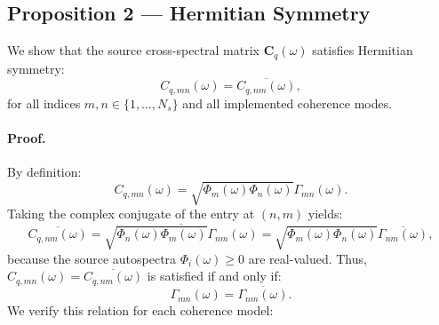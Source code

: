 \documentclass[11pt]{article}
\newcommand{\mat}[1]{\bm{#1}}
\begin{document}
\subsection{Proposition 2 --- Hermitian Symmetry}

We show that the source cross-spectral matrix $\mat{C}_q(\omega)$ satisfies Hermitian symmetry:
\begin{equation*}
    C_{q,mn}(\omega) = \overline{C_{q,nm}(\omega)},
\end{equation*}
for all indices $m, n \in \{1, \dots, N_s\}$ and all implemented coherence modes.

\paragraph{Proof.}
By definition:
\begin{equation*}
    C_{q,mn}(\omega) = \sqrt{\Phi_m(\omega)\Phi_n(\omega)} \Gamma_{mn}(\omega).
\end{equation*}
Taking the complex conjugate of the entry at $(n,m)$ yields:
\begin{equation*}
    \overline{C_{q,nm}(\omega)}
    =
    \overline{\sqrt{\Phi_n(\omega)\Phi_m(\omega)} \Gamma_{nm}(\omega)}
    =
    \sqrt{\Phi_m(\omega)\Phi_n(\omega)} \overline{\Gamma_{nm}(\omega)},
\end{equation*}
because the source autospectra $\Phi_i(\omega) \ge 0$ are real-valued. Thus, $C_{q,mn}(\omega) = \overline{C_{q,nm}(\omega)}$ is satisfied if and only if:
\begin{equation*}
    \Gamma_{mn}(\omega) = \overline{\Gamma_{nm}(\omega)}.
\end{equation*}
We verify this relation for each coherence model:
\end{document}
